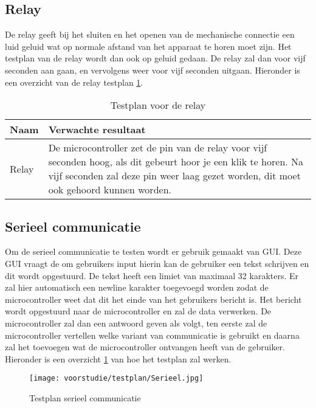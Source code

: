 \subsection{Relay}
De relay geeft bij het sluiten en het openen van de mechanische connectie een luid geluid wat op normale afstand van het apparaat te horen moet zijn. Het testplan van de relay wordt dan ook op geluid gedaan. De relay zal dan voor vijf seconden aan gaan, en vervolgens weer voor vijf seconden uitgaan. Hieronder is een overzicht van de relay testplan \ref{tab:hw_val_relay_testplan}.

\begin{table}[h!]
	\caption{Testplan voor de relay}
	\begin{tabular}{lp{14.5cm}}
	\toprule
	\textbf{Naam} 	& \textbf{Verwachte resultaat} \\ \toprule
	Relay			& De microcontroller zet de pin van de relay voor vijf seconden hoog, als dit gebeurt hoor je een klik te horen. Na vijf seconden zal deze pin weer laag gezet worden, dit moet ook gehoord kunnen worden.\\  \bottomrule
	\end{tabular}
	\label{tab:hw_val_relay_testplan}
\end{table}


\subsection{Serieel communicatie}
Om de serieel communicatie te testen wordt er gebruik gemaakt van GUI. Deze GUI vraagt de om gebruikers input hierin kan de gebruiker een tekst schrijven en dit wordt opgestuurd. De tekst heeft een limiet van maximaal 32 karakters. Er zal hier automatisch een newline karakter toegevoegd worden zodat de microcontroller weet dat dit het einde van het gebruikers bericht is. Het bericht wordt opgestuurd naar de microcontroller en zal de data verwerken. De microcontroller zal dan een antwoord geven als volgt, ten eerste zal de microcontroller vertellen welke variant van communicatie is gebruikt en daarna zal het toevoegen wat de microcontroller ontvangen heeft van de gebruiker. Hieronder is een overzicht \ref{fig:testplanserieel} van hoe het testplan zal werken.

\begin{figure}[h!]
	\centering

	\label{fig:testplanserieel}
	\texttt{[image: voorstudie/testplan/Serieel.jpg]}
	\caption{Testplan serieel communicatie}
\end{figure}

